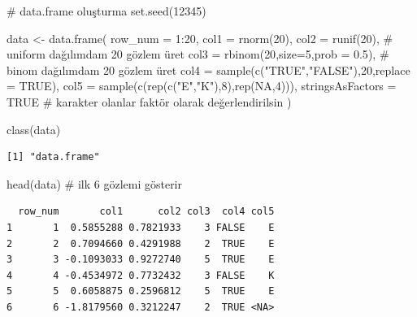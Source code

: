\documentclass[
  letterpaper,
  DIV=11,
  numbers=noendperiod]{scrreprt}
\newenvironment{Shaded}{\begin{snugshade}}{\end{snugshade}}
\newcommand{\AttributeTok}[1]{\textcolor[rgb]{0.40,0.45,0.13}{#1}}
\newcommand{\CommentTok}[1]{\textcolor[rgb]{0.37,0.37,0.37}{#1}}
\newcommand{\ConstantTok}[1]{\textcolor[rgb]{0.56,0.35,0.01}{#1}}
\newcommand{\DecValTok}[1]{\textcolor[rgb]{0.68,0.00,0.00}{#1}}
\newcommand{\FloatTok}[1]{\textcolor[rgb]{0.68,0.00,0.00}{#1}}
\newcommand{\FunctionTok}[1]{\textcolor[rgb]{0.28,0.35,0.67}{#1}}
\newcommand{\NormalTok}[1]{\textcolor[rgb]{0.00,0.23,0.31}{#1}}
\newcommand{\OtherTok}[1]{\textcolor[rgb]{0.00,0.23,0.31}{#1}}
\newcommand{\SpecialCharTok}[1]{\textcolor[rgb]{0.37,0.37,0.37}{#1}}
\newcommand{\StringTok}[1]{\textcolor[rgb]{0.13,0.47,0.30}{#1}}
\begin{document}
\begin{Shaded}
\begin{Highlighting}[]
\CommentTok{\# data.frame oluşturma}
\FunctionTok{set.seed}\NormalTok{(}\DecValTok{12345}\NormalTok{)}

\NormalTok{data }\OtherTok{\textless{}{-}} \FunctionTok{data.frame}\NormalTok{(}
  \AttributeTok{row\_num =} \DecValTok{1}\SpecialCharTok{:}\DecValTok{20}\NormalTok{,}
  \AttributeTok{col1 =} \FunctionTok{rnorm}\NormalTok{(}\DecValTok{20}\NormalTok{),}
  \AttributeTok{col2 =} \FunctionTok{runif}\NormalTok{(}\DecValTok{20}\NormalTok{), }\CommentTok{\# uniform dağılımdam 20 gözlem üret}
  \AttributeTok{col3 =} \FunctionTok{rbinom}\NormalTok{(}\DecValTok{20}\NormalTok{,}\AttributeTok{size=}\DecValTok{5}\NormalTok{,}\AttributeTok{prob =} \FloatTok{0.5}\NormalTok{), }\CommentTok{\# binom dağılımdam 20 gözlem üret}
  \AttributeTok{col4 =} \FunctionTok{sample}\NormalTok{(}\FunctionTok{c}\NormalTok{(}\StringTok{"TRUE"}\NormalTok{,}\StringTok{"FALSE"}\NormalTok{),}\DecValTok{20}\NormalTok{,}\AttributeTok{replace =} \ConstantTok{TRUE}\NormalTok{),}
  \AttributeTok{col5 =} \FunctionTok{sample}\NormalTok{(}\FunctionTok{c}\NormalTok{(}\FunctionTok{rep}\NormalTok{(}\FunctionTok{c}\NormalTok{(}\StringTok{"E"}\NormalTok{,}\StringTok{"K"}\NormalTok{),}\DecValTok{8}\NormalTok{),}\FunctionTok{rep}\NormalTok{(}\ConstantTok{NA}\NormalTok{,}\DecValTok{4}\NormalTok{))),}
  \AttributeTok{stringsAsFactors =} \ConstantTok{TRUE} \CommentTok{\# karakter olanlar faktör olarak değerlendirilsin}
\NormalTok{)}

\FunctionTok{class}\NormalTok{(data)}
\end{Highlighting}
\end{Shaded}

\begin{verbatim}
[1] "data.frame"
\end{verbatim}

\begin{Shaded}
\begin{Highlighting}[]
\FunctionTok{head}\NormalTok{(data) }\CommentTok{\# ilk 6 gözlemi gösterir}
\end{Highlighting}
\end{Shaded}

\begin{verbatim}
  row_num       col1      col2 col3  col4 col5
1       1  0.5855288 0.7821933    3 FALSE    E
2       2  0.7094660 0.4291988    2  TRUE    E
3       3 -0.1093033 0.9272740    5  TRUE    E
4       4 -0.4534972 0.7732432    3 FALSE    K
5       5  0.6058875 0.2596812    5  TRUE    E
6       6 -1.8179560 0.3212247    2  TRUE <NA>
\end{verbatim}
\end{document}
